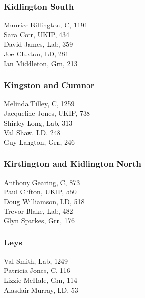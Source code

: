 \documentclass[a4paper,openany,10pt]{book}
\begin{document}
\subsubsection*{Kidlington South}



Maurice Billington, C, 1191\\
Sara Corr, UKIP, 434\\
David James, Lab, 359\\
Joe Claxton, LD, 281\\
Ian Middleton, Grn, 213\\


\subsubsection*{Kingston and Cumnor}



Melinda Tilley, C, 1259\\
Jacqueline Jones, UKIP, 738\\
Shirley Long, Lab, 313\\
Val Shaw, LD, 248\\
Guy Langton, Grn, 246\\


\subsubsection*{Kirtlington and Kidlington North}



Anthony Gearing, C, 873\\
Paul Clifton, UKIP, 550\\
Doug Williamson, LD, 518\\
Trevor Blake, Lab, 482\\
Glyn Sparkes, Grn, 176\\


\subsubsection*{Leys}



Val Smith, Lab, 1249\\
Patricia Jones, C, 116\\
Lizzie McHale, Grn, 114\\
Alasdair Murray, LD, 53\\
\end{document}
